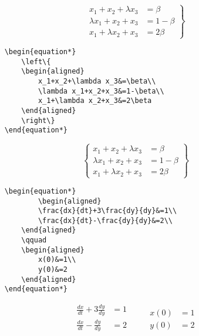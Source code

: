 \documentclass[12pt]{book}
\numberwithin{equation}{section}
\theoremstyle{plain}  %
\begin{document}
	\begin{equation*}
	\left.
	\begin{aligned}
		x_1+x_2+\lambda x_3&=\beta\\
		\lambda x_1+x_2+x_3&=1-\beta\\
		x_1+\lambda x_2+x_3&=2\beta
	\end{aligned}
	\right\}
\end{equation*}


\begin{verbatim}
	\begin{equation*}
		\left\{
		\begin{aligned}
			x_1+x_2+\lambda x_3&=\beta\\
			\lambda x_1+x_2+x_3&=1-\beta\\
			x_1+\lambda x_2+x_3&=2\beta
		\end{aligned}
		\right\}
	\end{equation*}
\end{verbatim}


\begin{equation*}
	\left\{
	\begin{aligned}
		x_1+x_2+\lambda x_3&=\beta\\
		\lambda x_1+x_2+x_3&=1-\beta\\
		x_1+\lambda x_2+x_3&=2\beta
	\end{aligned}
	\right\}
\end{equation*}


\begin{verbatim}
	\begin{equation*}
			\begin{aligned}
			\frac{dx}{dt}+3\frac{dy}{dy}&=1\\
			\frac{dx}{dt}-\frac{dy}{dy}&=2\\
		\end{aligned}
		\qquad
		\begin{aligned}
			x(0)&=1\\
			y(0)&=2
		\end{aligned}
	\end{equation*}
\end{verbatim}


	\begin{equation*}
	\begin{aligned}
		\frac{dx}{dt}+3\frac{dy}{dy}&=1\\
		\frac{dx}{dt}-\frac{dy}{dy}&=2\\
	\end{aligned}
	\qquad
	\begin{aligned}
		x(0)&=1\\
		y(0)&=2
	\end{aligned}
\end{equation*}
\end{document}
